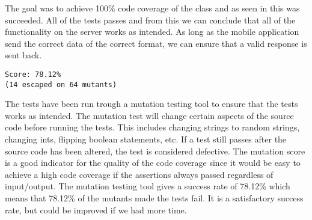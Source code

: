 The goal was to achieve 100\% code coverage of the  class and as seen in  this was succeeded. All of the tests passes and from this we can conclude that all of the functionality on the server works as intended. As long as the mobile application send the correct data of the correct format, we can ensure that a valid response is sent back.

\begin{lstlisting}[numbers=none, basicstyle=\ttfamily, caption={The result of the Mutagenesis test.}]
Score: 78.12%
(14 escaped on 64 mutants)
\end{lstlisting}

The tests have been run trough a mutation testing tool\cite{mutagenesis} to ensure that the tests works as intended. The mutation test will change certain aspects of the source code before running the tests. This includes changing strings to random strings, changing ints, flipping boolean statements, etc. If a test still passes after the source code has been altered, the test is considered defective. The mutation score is a good indicator for the quality of the code coverage since it would be easy to achieve a high code coverage if the assertions always passed regardless of input/output. The mutation testing tool gives a success rate of 78.12\% which means that 78.12\% of the mutants made the tests fail. It is a satisfactory success rate, but could be improved if we had more time.

